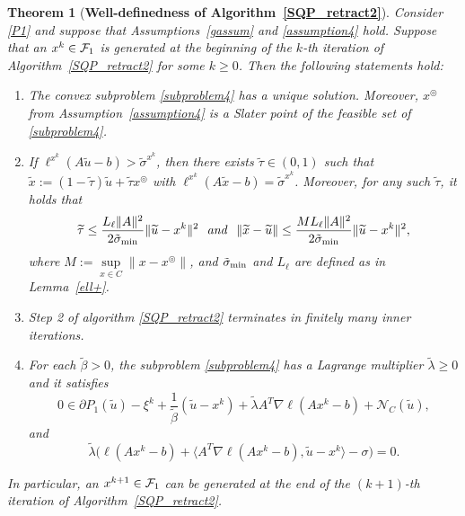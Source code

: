 \documentclass[10pt]{article}
\numberwithin{equation}{section}
\newtheorem{theorem}{Theorem}[section]
\def\sigmamin{{\rm\tilde{\sigma}_{min}}}
\def\xfeasss{x^\circledcirc}
\begin{document}
\begin{theorem}[{{\bf Well-definedness of Algorithm~\ref{SQP_retract2}}}]\label{welldef2}
Consider \eqref{P1} and suppose that Assumptions~\ref{gassum} and \ref{assumption4} hold. Suppose that an $x^k\in {\cal F}_1$ is generated {\color{blue} at the beginning of the $k$-th iteration} of Algorithm~\ref{SQP_retract2} for some $k\ge 0$. Then the following statements hold:
\begin{enumerate}[{\rm (i)}]
   \item The convex subproblem \eqref{subproblem4} has a unique solution. Moreover, $\xfeasss$ from Assumption~\ref{assumption4} is a Slater point of the feasible set of \eqref{subproblem4}.
   \item If $\ell^{x^k}(A\widetilde{u} - b) > \tilde{\sigma}^{x^k}$, then there exists $\widetilde{\tau}\in (0, 1)$ such that $\widetilde{x}:=(1 - \widetilde{\tau})\widetilde{u} + \widetilde{\tau} \xfeasss$ with $\ell^{x^k}(A\widetilde{x} - b) = \tilde{\sigma}^{x^k}$. Moreover, for any such $\widetilde\tau$, it holds that
       \[
       \widetilde{\tau} \leq \frac{L_{\ell}\|A\|^2}{2\sigmamin}\|\widetilde{u} - x^k\|^2
       \ \ {\it and}\ \ \|\widetilde{x} - \widetilde{u}\| \leq \frac{ML_{\ell}\|A\|^2}{2\sigmamin}\|\widetilde{u} - x^k\|^2,
       \]
       where $M := \sup\limits_{x\in C}\|x - \xfeasss\|$, and $\sigmamin$ and $L_\ell$ are defined as in Lemma~\ref{ell+}.
   \item Step 2 of algorithm \ref{SQP_retract2} terminates in finitely many inner iterations.
   \item For each $\widetilde{\beta} > 0$, the subproblem \eqref{subproblem4} has a Lagrange multiplier $\widetilde\lambda\geq 0$ and it satisfies
       \begin{equation*}
       0\in \partial P_1(\widetilde{u}) - \xi^k +\frac{1}{\widetilde{\beta}}(\widetilde{u} - x^k) +\widetilde\lambda A^T\nabla\ell(Ax^k - b) + \mathcal{N}_C(\widetilde{u}),
       \end{equation*}
       and
       \begin{equation*}
       \widetilde\lambda\big(\ell(Ax^k - b) + \langle A^T\nabla\ell(Ax^k - b), \widetilde{u}-x^k\rangle - \sigma\big) = 0.
       \end{equation*}
 \end{enumerate}
 In particular, an $x^{k+1}\in {\cal F}_1$ can be generated at the end of the $(k + 1)$-th iteration of Algorithm~\ref{SQP_retract2}.
\end{theorem}
\end{document}

